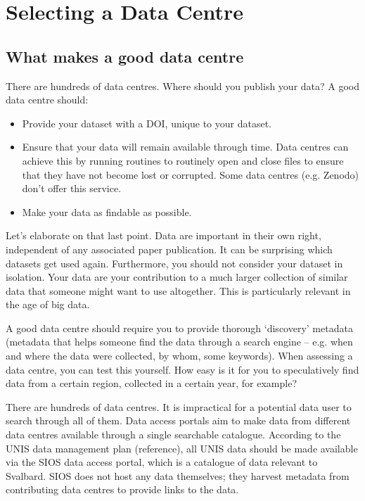 \documentclass[a4paper,12pt]{article}
\begin{document}
\section{Selecting a Data Centre}

\subsection{What makes a good data centre}

There are hundreds of data centres. Where should you publish your data? A good data centre should:
\begin{itemize}
    \item Provide your dataset with a DOI, unique to your dataset.
    \item Ensure that your data will remain available through time. Data centres can achieve this by running routines to routinely open and close files to ensure that they have not become lost or corrupted. Some data centres (e.g. Zenodo) don’t offer this service.
    \item Make your data as findable as possible.
\end{itemize}

Let’s elaborate on that last point. Data are important in their own right, independent of any associated paper publication. It can be surprising which datasets get used again. Furthermore, you should not consider your dataset in isolation. Your data are your contribution to a much larger collection of similar data that someone might want to use altogether. This is particularly relevant in the age of big data.

A good data centre should require you to provide thorough ‘discovery’ metadata (metadata that helps someone find the data through a search engine – e.g. when and where the data were collected, by whom, some keywords). When assessing a data centre, you can test this yourself. How easy is it for you to speculatively find data from a certain region, collected in a certain year, for example?

There are hundreds of data centres. It is impractical for a potential data user to search through all of them. Data access portals aim to make data from different data centres available through a single searchable catalogue. According to the UNIS data management plan (reference), all UNIS data should be made available via the SIOS data access portal, which is a catalogue of data relevant to Svalbard. SIOS does not host any data themselves; they harvest metadata from contributing data centres to provide links to the data.
\end{document}
